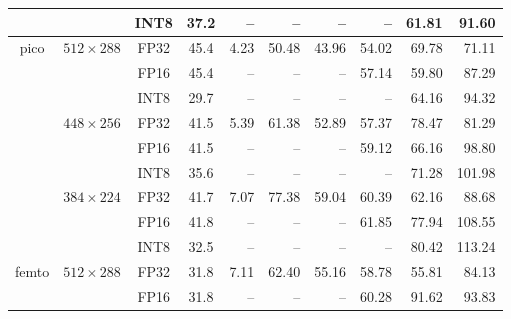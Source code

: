 \begin{appendices}
\begin{table}[h]
\begin{threeparttable}
\begin{tabular}{|c|c|c|c|rrrrrr|}
                                                                    &                                   & INT8 & 37.2 &    -- &     -- &    -- &    -- & 61.81 &  91.60 \\
            \hline
            \multirow{9}{*}{pico}                                     & \multirow{3}{*}{$512 \times 288$} & FP32 & 45.4 &  4.23 &  50.48 & 43.96 & 54.02 & 69.78 &  71.11 \\
                                                                    &                                   & FP16 & 45.4 &    -- &     -- &    -- & 57.14 & 59.80 &  87.29 \\
                                                                    &                                   & INT8 & 29.7 &    -- &     -- &    -- &    -- & 64.16 &  94.32 \\
            \cline{2-10}
                                                                    & \multirow{3}{*}{$448 \times 256$} & FP32 & 41.5 &  5.39 &  61.38 & 52.89 & 57.37 & 78.47 &  81.29 \\
                                                                    &                                   & FP16 & 41.5 &    -- &     -- &    -- & 59.12 & 66.16 &  98.80 \\
                                                                    &                                   & INT8 & 35.6 &    -- &     -- &    -- &    -- & 71.28 & 101.98 \\
            \cline{2-10}
                                                                    & \multirow{3}{*}{$384 \times 224$} & FP32 & 41.7 &  7.07 &  77.38 & 59.04 & 60.39 & 62.16 &  88.68 \\
                                                                    &                                   & FP16 & 41.8 &    -- &     -- &    -- & 61.85 & 77.94 & 108.55 \\
                                                                    &                                   & INT8 & 32.5 &    -- &     -- &    -- &    -- & 80.42 & 113.24 \\
            \hline
            \multirow{12}{*}{femto}                                   & \multirow{3}{*}{$512 \times 288$} & FP32 & 31.8 &  7.11 &  62.40 & 55.16 & 58.78 & 55.81 &  84.13 \\
                                                                    &                                   & FP16 & 31.8 &    -- &     -- &    -- & 60.28 & 91.62 &  93.83 \\

\end{tabular}
\end{threeparttable}
\end{table}
\end{appendices}
